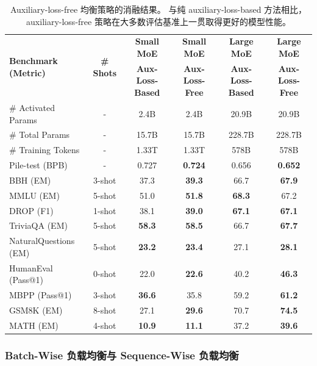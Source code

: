 \documentclass[11pt, a4paper, logo, copyright, nonumbering]{deepseek}
\let\oldfootnotesize\footnotesize
\renewcommand{\footnotesize}{\oldfootnotesize\itshape}
\begin{document}
\begin{table}[t]
    \centering
    \footnotesize
    \setlength{\tabcolsep}{4pt}
    \begin{tabular}{@{}l c | c c | c c@{}}
    \toprule
    \multirow{2}{*}{\centering \textbf{Benchmark (Metric)}} & \multirow{2}{*}{\textbf{\# Shots}} & \textbf{Small MoE} & \textbf{Small MoE} & \textbf{Large MoE} & \textbf{Large MoE} \\
     & & \textbf{Aux-Loss-Based} & \textbf{Aux-Loss-Free} & \textbf{Aux-Loss-Based} & \textbf{Aux-Loss-Free} \\
    \midrule
    \# Activated Params & - & 2.4B & 2.4B & 20.9B & 20.9B \\
    \# Total Params & - & 15.7B & 15.7B & 228.7B & 228.7B \\
    \# Training Tokens & - & 1.33T & 1.33T & 578B & 578B \\
    \midrule
    Pile-test {\tiny (BPB)} & - & 0.727 & \textbf{0.724} & 0.656 & \textbf{0.652} \\
    BBH {\tiny (EM)} & 3-shot & 37.3 & \textbf{39.3} & 66.7 & \textbf{67.9} \\
    MMLU {\tiny (EM)} & 5-shot & 51.0 & \textbf{51.8} & \textbf{68.3} & 67.2 \\
    DROP {\tiny (F1)} & 1-shot & 38.1 & \textbf{39.0} & \textbf{67.1} & \textbf{67.1} \\
    TriviaQA {\tiny (EM)} & 5-shot & \textbf{58.3} & \textbf{58.5} & 66.7 & \textbf{67.7} \\
    NaturalQuestions {\tiny (EM)} & 5-shot & \textbf{23.2} & \textbf{23.4} & 27.1 & \textbf{28.1} \\
    HumanEval {\tiny (Pass@1)} & 0-shot & 22.0 & \textbf{22.6} & 40.2 & \textbf{46.3} \\
    MBPP {\tiny (Pass@1)} & 3-shot & \textbf{36.6} & 35.8 & 59.2 & \textbf{61.2} \\
    GSM8K {\tiny (EM)} & 8-shot & 27.1 & \textbf{29.6} & 70.7 & \textbf{74.5} \\
    MATH {\tiny (EM)} & 4-shot & \textbf{10.9} & \textbf{11.1} & 37.2 & \textbf{39.6} \\
    \bottomrule
    \end{tabular}
    \caption{
    Auxiliary-loss-free 均衡策略的消融结果。
    与纯 auxiliary-loss-based 方法相比，auxiliary-loss-free 策略在大多数评估基准上一贯取得更好的模型性能。
    }
    \label{tab:ablation_noaux_tc}
\end{table}

\subsubsection{Batch-Wise 负载均衡与 Sequence-Wise 负载均衡}
\label{discussion:balance}
\end{document}

